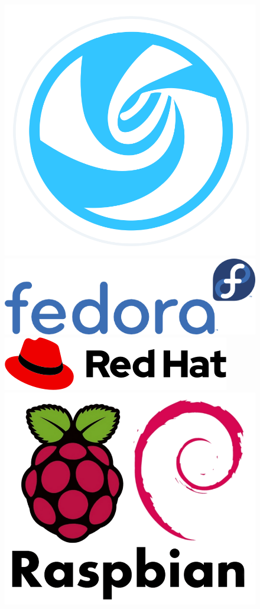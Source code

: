 \begin{figure}[ht!]
	\includegraphics[width=0.2\paperwidth]{./img/linux/deepin}
	\includegraphics[width=0.2\paperwidth]{./img/linux/fedora}
	\includegraphics[width=0.2\paperwidth]{./img/linux/redhat}
	\includegraphics[width=0.2\paperwidth]{./img/linux/raspbian}

\end{figure}
